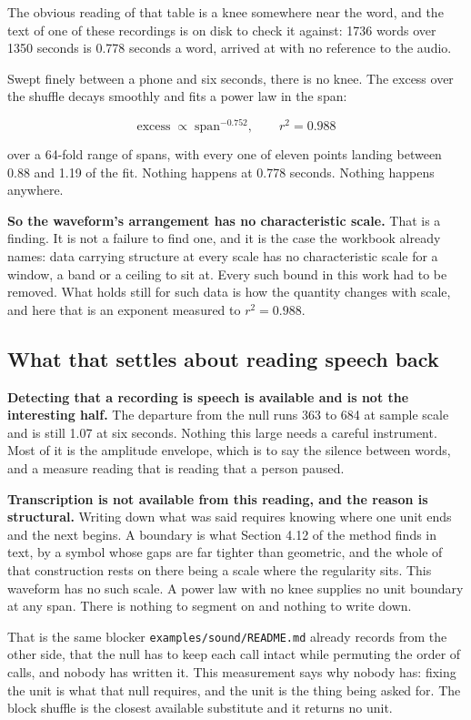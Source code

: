 The obvious reading of that table is a knee somewhere near the word, and the text of one of these
recordings is on disk to check it against: 1736 words over 1350 seconds is 0.778 seconds a word,
arrived at with no reference to the audio.

Swept finely between a phone and six seconds, there is no knee. The excess over the shuffle decays
smoothly and fits a power law in the span:

\[
\text{excess} \;\propto\; \text{span}^{-0.752}, \qquad r^2 = 0.988
\]

over a 64-fold range of spans, with every one of eleven points landing between 0.88 and 1.19 of the
fit. Nothing happens at 0.778 seconds. Nothing happens anywhere.

\textbf{So the waveform's arrangement has no characteristic scale.} That is a finding. It is not a
failure to find one, and it is the case the workbook already names: data carrying structure at every
scale has no characteristic scale for a window, a band or a ceiling to sit at. Every
such bound in this work had to be removed. What holds still for such data is how the quantity changes
with scale, and here that is an exponent measured to \(r^2 = 0.988\).

\subsection{What that settles about reading speech back}

\textbf{Detecting that a recording is speech is available and is not the interesting half.} The
departure from the null runs 363 to 684 at sample scale and is still 1.07 at six seconds. Nothing
this large needs a careful instrument. Most of it is the amplitude envelope, which is to say the
silence between words, and a measure reading that is reading that a person paused.

\textbf{Transcription is not available from this reading, and the reason is structural.} Writing down
what was said requires knowing where one unit ends and the next begins. A boundary is what
Section 4.12 of the method finds in text, by a symbol whose gaps are far tighter than geometric, and
the whole of that construction rests on there being a scale where the regularity sits. This waveform
has no such scale. A power law with no knee supplies no unit boundary at any span. There is
nothing to segment on and nothing to write down.

That is the same blocker \texttt{examples/\allowbreak{}sound/\allowbreak{}README.\allowbreak{}md}
already records from the other side, that the null has to keep each call intact while
permuting the order of calls, and nobody has written it. This measurement says why nobody has: fixing
the unit is what that null requires, and the unit is the thing being asked for. The block shuffle is
the closest available substitute and it returns no unit.

